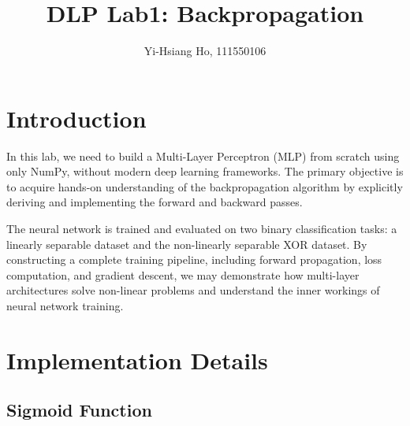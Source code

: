 \documentclass[10pt,twocolumn,letterpaper]{article}
\begin{document}
\title{DLP Lab1: Backpropagation}

\author{Yi-Hsiang Ho, 111550106
}
\maketitle



\section{Introduction}
\label{sec:intro}

In this lab, we need to build a Multi-Layer Perceptron (MLP) from scratch using only
NumPy, without modern deep learning frameworks. The primary objective is to
acquire hands-on understanding of the backpropagation algorithm by explicitly
deriving and implementing the forward and backward passes.

The neural network is trained and evaluated on two binary classification tasks:
a linearly separable dataset and the non-linearly separable XOR dataset. By
constructing a complete training pipeline, including forward propagation, loss
computation, and gradient descent, we may demonstrate how multi-layer
architectures solve non-linear problems and understand the inner workings
of neural network training.



\section{Implementation Details}
\label{sec:impl}

\subsection{Sigmoid Function}
\label{subsec:sigmoid}
\end{document}
